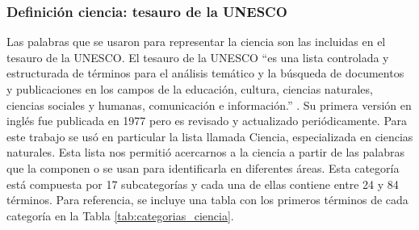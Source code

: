 \documentclass[11pt,a4paper]{article}
\begin{document}
	\subsubsection{Definición ciencia: tesauro de la UNESCO}
	Las palabras que se usaron para representar la ciencia son las incluidas en el tesauro de la UNESCO.
	El tesauro de la UNESCO ``es una lista controlada y estructurada de términos para el análisis temático y la búsqueda de documentos y publicaciones en los campos de la educación, cultura, ciencias naturales, ciencias sociales y humanas, comunicación e información.'' \cite{unesco_thesaurus_1977}. 
	Su primera versión en inglés fue publicada en 1977 pero es revisado y actualizado periódicamente. Para este trabajo se usó en particular la lista llamada Ciencia, especializada en ciencias naturales. Esta lista nos permitió acercarnos a la ciencia a partir de las palabras que la componen o se usan para identificarla en diferentes áreas. Esta categoría está compuesta por 17 subcategorías y cada una de ellas contiene entre 24 y 84 términos.
	Para referencia, se incluye una tabla con los primeros términos de cada categoría en la Tabla \ref{tab:categorias_ciencia}.
	
\end{document}
